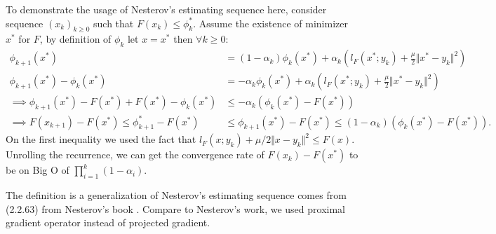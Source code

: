 \documentclass[12pt]{article}
\begin{document}
    To demonstrate the usage of Nesterov's estimating sequence here, consider sequence $(x_k)_{k \ge 0}$ such that $F(x_k) \le \phi_k^*$. 
    Assume the existence of minimizer $x^*$ for $F$, by definition of $\phi_k$ let $x = x^*$ then $\forall k \ge 0$: 
    {\small
    \begin{align*}
        \phi_{k + 1}(x^*)
        &= (1 - \alpha_k)\phi_k (x^*) + 
        \alpha_k 
        \left(
            l_F(x^*; y_k) + \frac{\mu}{2}\Vert x^* - y_k\Vert^2
        \right)
        \\
        \phi_{k + 1}(x^*) - \phi_k(x^*) &= 
        -\alpha_k\phi_k(x^*) 
        +
        \alpha_k
        \left(
            l_F(x^*; y_k) + \frac{\mu}{2}\Vert x^* - y_k\Vert^2
        \right) 
        \\
        \implies
        \phi_{k + 1}(x^*) - F(x^*) + F(x^*) - \phi_k(x^*) 
        &\le -\alpha_k(\phi_k(x^*) - F(x^*))
        \\
        \implies 
        F(x_{k + 1}) - F(x^*)
        \le \phi_{k + 1}^* - F(x^*)
        &\le \phi_{k + 1}(x^*) - F(x^*)
        \le 
        (1 - \alpha_k)(\phi_k(x^*) - F(x^*)). 
    \end{align*}
    }
    On the first inequality we used the fact that $l_F(x; y_k) + \mu/2\Vert x - y_k\Vert^2\le F(x)$. 
    Unrolling the recurrence, we can get the convergence rate of $F(x_k) - F(x^*)$ to be on Big O of $\prod_{i = 1}^k(1 - \alpha_i)$. 
    \begin{remark}
        The definition is a generalization of Nesterov's estimating sequence comes from (2.2.63) from Nesterov's book \cite{nesterov_lectures_2018}. 
        Compare to Nesterov's work, we used proximal gradient operator instead of projected gradient. 
    \end{remark}
\end{document}

